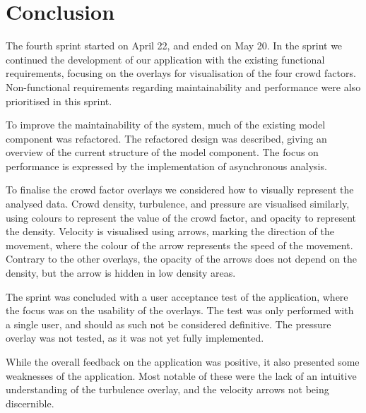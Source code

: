 \section{Conclusion} \label{sec:s4_conclusion}
The fourth sprint started on April 22, and ended on May 20. In the sprint we continued the development of our application with the existing functional requirements, focusing on the overlays for visualisation of the four crowd factors. Non-functional requirements  regarding maintainability and performance were also prioritised in this sprint.

To improve the maintainability of the system, much of the existing model component was refactored. The refactored design was described, giving an overview of the current structure of the model component. The focus on performance is expressed by the implementation of asynchronous analysis.

To finalise the crowd factor overlays we considered how to visually represent the analysed data. Crowd density, turbulence, and pressure are visualised similarly, using colours to represent the value of the crowd factor, and opacity to represent the density. Velocity is visualised using arrows, marking the direction of the movement, where the colour of the arrow represents the speed of the movement. Contrary to the other overlays, the opacity of the arrows does not depend on the density, but the arrow is hidden in low density areas.

The sprint was concluded with a user acceptance test of the application, where the focus was on the usability of the overlays. The test was only performed with a single user, and should as such not be considered definitive. The pressure overlay was not tested, as it was not yet fully implemented.

While the overall feedback on the application was positive, it also presented some weaknesses of the application. Most notable of these were the lack of an intuitive understanding of the turbulence overlay, and the velocity arrows not being discernible. 

